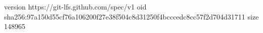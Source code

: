 version https://git-lfs.github.com/spec/v1
oid sha256:97a150d55cf76a106200f27e38f504c8d31250f4bcccedc8cc57f2d704d31711
size 148965
